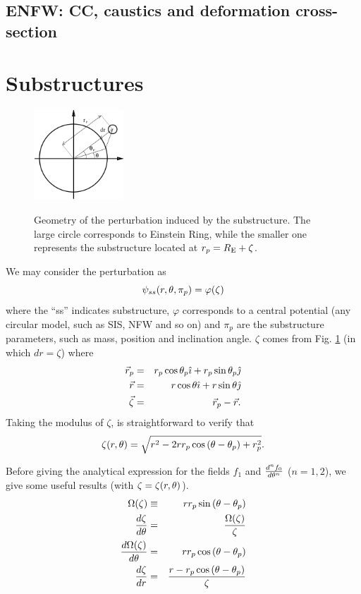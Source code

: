 \subsection{ENFW: CC, caustics and deformation cross-section}
\section{Substructures}
\begin{figure}
  \begin{center}
   \includegraphics[width=0.30\textwidth]{graphics/Fig_subsstructure.pdf}
\label{fig:substruc}
  \end{center}
    \caption{Geometry of the perturbation induced by the substructure. The large
circle corresponds to Einstein Ring,
  while the smaller one represents the substructure located at $r_p=R_{\mathrm{E}}
+\zeta$.}
\end{figure}

We may consider the perturbation as
\begin{equation}
\psi_{ss}(r,\theta,\pi_p)=\varphi(\zeta)
\end{equation}
where the ``ss'' indicates substructure, $\varphi$ corresponds to a central
potential (any circular model, such as SIS, NFW and so on) and $\pi_p$
are the substructure parameters, such as mass, position and inclination angle.
$\zeta$ comes from Fig. \ref{fig:substruc} (in which $dr=\zeta$)
where
\begin{eqnarray}
\vec{r}_p&=&r_p\cos{\theta_p}\hat{\imath} + r_p\sin{\theta_p}\hat{\jmath}\\
\vec{r}&=&r\cos{\theta}\hat{\imath} + r\sin{\theta}\hat{\jmath}\\
\vec{\zeta}&=&\vec{r}_p-\vec{r}.
\end{eqnarray}
Taking the modulus of $\zeta$, is straightforward to verify that
\begin{equation}
\zeta(r,\theta)=\sqrt{r^2-2r r_p\cos{(\theta-\theta_p)}+r^2_p}.
\label{xirte}
\end{equation}

Before giving the analytical expression for the fields $f_1$ and ${d^nf_0 \over
d\theta^n}$ ($n=1,2$), we
give some useful results (with $\zeta = \zeta(r,\theta)$).
\begin{eqnarray}
\Omega(\zeta) & \equiv & r r_p \sin{(\theta-\theta_p)} \\
\dfrac{d\zeta}{d\theta}&=&  \dfrac{\Omega(\zeta)}{\zeta}\\
\dfrac{d\Omega(\zeta)}{d\theta}&=&r r_p\cos{(\theta-\theta_p)}\\
\dfrac{d\zeta}{dr}&=&\dfrac{r-r_p\cos{(\theta-\theta_p)}}{\zeta}
\end{eqnarray}

